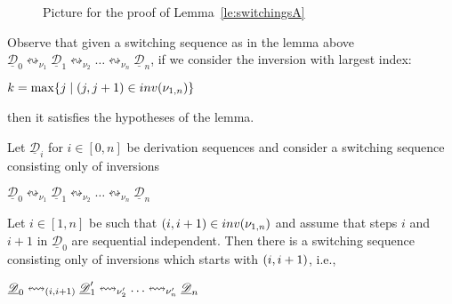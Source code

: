 \documentclass[a4paper,UKenglish,cleveref,pdftex, thm-restate,numberwithinsect,anonymous]{lipics}
\newcommand{\interval}[2][1]{\ensuremath{[{#1},{#2}]}}
\newcommand{\dder}[1]{\mathscr{#1}}
\newcommand{\der}[1]{\underline{\dder{#1}}}
\newcommand{\inv}[1]{\mathsf{inv}({#1})}
\newcommand{\shift}[1]{\ensuremath{\mathrel{{\leftrightsquigarrow}_{#1}}}}
\begin{document}
\begin{figure}
  \caption{Picture for the proof of Lemma~\ref{le:switchingsA}}
  \label{fi:switchA}
\end{figure}


\begin{remark}
  \label{rem:switchA}
  Observe that given a switching sequence as in the lemma above
  $\der{D}_0 \shift{\nu_1} \der{D}_1 \shift{\nu_2} \ldots
  \shift{\nu_n} \der{D}_n$, if we consider the inversion with largest index:
  \begin{center}
    $k = \max \{j \mid \transp{j} \in \inv{\nu_{1,n}}\}$
  \end{center}
  then it satisfies the hypotheses of the lemma.
\end{remark}

\begin{lemma}
  \label{le:switchB}
  Let $\der{D}_i$ for $i \in \interval[0]{n}$ be derivation sequences
  and consider a switching sequence consisting only of inversions
  \begin{center}
    $\der{D}_0 \shift{\nu_1} \der{D}_1 \shift{\nu_2} \ldots
    \shift{\nu_n} \der{D}_n$
  \end{center}
  Let $i \in \interval{n}$ be such that
  $\transp{i} \in \inv{\nu_{1,n}}$ and assume that steps $i$ and $i+1$ in $\der{D}_0$ are sequential independent. Then there is a switching sequence
  consisting only of inversions which starts with $\transp{i}$, i.e.,
  \begin{center}
    $\der{D}_0 \shift{\transp{i}} \der{D}_1' \shift{\nu_2'} \ldots
    \shift{\nu_n'} \der{D}_n$
  \end{center}
\end{lemma}
\end{document}
